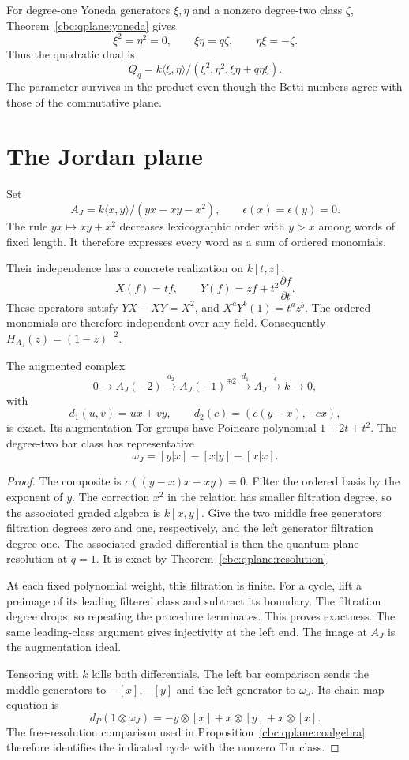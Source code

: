 For degree-one Yoneda generators $\xi,\eta$ and a nonzero degree-two class $\zeta$, Theorem~\ref{cbc:qplane:yoneda} gives
\[
 \xi^2=\eta^2=0,\qquad \xi\eta=q\zeta,\qquad \eta\xi=-\zeta.
\]
Thus the quadratic dual is
\[
 Q_q=k\langle\xi,\eta\rangle/(\xi^2,\eta^2,\xi\eta+q\eta\xi).
\]
The parameter survives in the product even though the Betti numbers agree with those of the commutative plane.

\section{The Jordan plane}

Set
\[
 A_J=k\langle x,y\rangle/(yx-xy-x^2),\qquad
 \epsilon(x)=\epsilon(y)=0.
\]
The rule $yx\mapsto xy+x^2$ decreases lexicographic order with $y>x$ among words of fixed length.
It therefore expresses every word as a sum of ordered monomials.

Their independence has a concrete realization on $k[t,z]$:
\[
 X(f)=tf,\qquad Y(f)=zf+t^2\frac{\partial f}{\partial t}.
\]
These operators satisfy $YX-XY=X^2$, and $X^aY^b(1)=t^az^b$.
The ordered monomials are therefore independent over any field.
Consequently $H_{A_J}(z)=(1-z)^{-2}$.

\begin{theorem}\label{thm:jordan}
The augmented complex
\[
 0\longrightarrow A_J(-2)\xrightarrow{d_2}A_J(-1)^{\oplus2}
 \xrightarrow{d_1}A_J\xrightarrow{\epsilon}k\longrightarrow0,
\]
with
\[
 d_1(u,v)=ux+vy,\qquad d_2(c)=(c(y-x),-cx),
\]
is exact.
Its augmentation Tor groups have Poincare polynomial $1+2t+t^2$.
The degree-two bar class has representative
\[
 \omega_J=[y|x]-[x|y]-[x|x].
\]
\end{theorem}
\begin{proof}
The composite is $c((y-x)x-xy)=0$.
Filter the ordered basis by the exponent of $y$.
The correction $x^2$ in the relation has smaller filtration degree, so the associated graded algebra is $k[x,y]$.
Give the two middle free generators filtration degrees zero and one, respectively, and the left generator filtration degree one.
The associated graded differential is then the quantum-plane resolution at $q=1$.
It is exact by Theorem~\ref{cbc:qplane:resolution}.

At each fixed polynomial weight, this filtration is finite.
For a cycle, lift a preimage of its leading filtered class and subtract its boundary.
The filtration degree drops, so repeating the procedure terminates.
This proves exactness.
The same leading-class argument gives injectivity at the left end.
The image at $A_J$ is the augmentation ideal.

Tensoring with $k$ kills both differentials.
The left bar comparison sends the middle generators to $-[x],-[y]$ and the left generator to $\omega_J$.
Its chain-map equation is
\[
 d_P(1\otimes\omega_J)
 =-y\otimes[x]+x\otimes[y]+x\otimes[x].
\]
The free-resolution comparison used in Proposition~\ref{cbc:qplane:coalgebra} therefore identifies the indicated cycle with the nonzero Tor class.
\end{proof}


